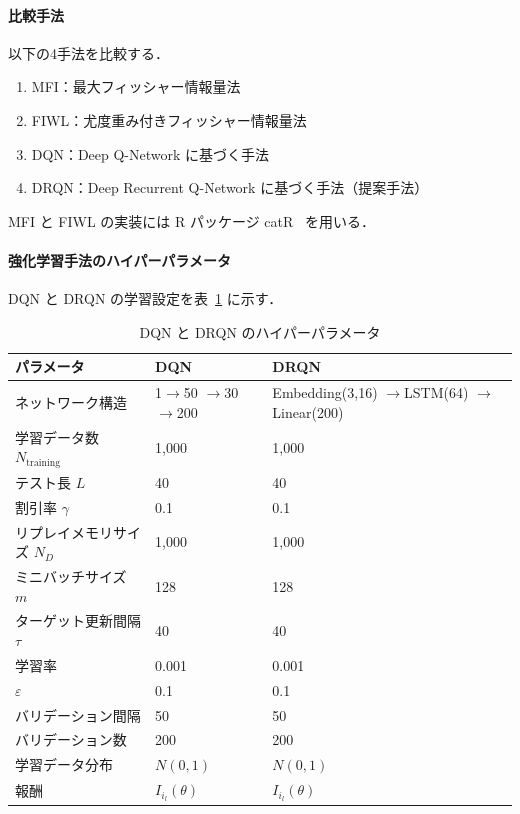 \documentclass[dvipdfmx,a4j]{jarticle}
\begin{document}
\paragraph{比較手法}
以下の4手法を比較する．
\begin{enumerate}
\item MFI：最大フィッシャー情報量法~\cite{lord1980}
\item FIWL：尤度重み付きフィッシャー情報量法~\cite{veerkamp1997}
\item DQN：Deep Q-Network に基づく手法~\cite{wang2024}
\item DRQN：Deep Recurrent Q-Network に基づく手法（提案手法）
\end{enumerate}
MFI と FIWL の実装には R パッケージ catR~\cite{magis2017} を用いる．

\paragraph{強化学習手法のハイパーパラメータ}
DQN と DRQN の学習設定を表~\ref{tab:hyperparams} に示す．

\begin{table}[t]
\centering
\caption{DQN と DRQN のハイパーパラメータ}
\label{tab:hyperparams}
\scriptsize
\setlength{\tabcolsep}{3pt}
\begin{tabular}{p{}p{}p{}}
\toprule
パラメータ & DQN & DRQN \\
\midrule
ネットワーク構造 & \shortstack[l]{1$\to$50\\$\to$30$\to$200} & \shortstack[l]{Embedding(3,16)\\$\to$LSTM(64)\\$\to$Linear(200)} \\
学習データ数 $N_{\mathrm{training}}$ & 1,000 & 1,000 \\
テスト長 $L$ & 40 & 40 \\
割引率 $\gamma$ & 0.1 & 0.1 \\
リプレイメモリサイズ $N_D$ & 1,000 & 1,000 \\
ミニバッチサイズ $m$ & 128 & 128 \\
ターゲット更新間隔 $\tau$ & 40 & 40 \\
学習率 & 0.001 & 0.001 \\
$\varepsilon$ & 0.1 & 0.1 \\
バリデーション間隔 & 50 & 50 \\
バリデーション数 & 200 & 200 \\
学習データ分布 & $N(0,1)$ & $N(0,1)$ \\
報酬 & $I_{i_l}(\theta)$ & $I_{i_l}(\theta)$ \\
\bottomrule
\end{tabular}
\end{table}
\end{document}
